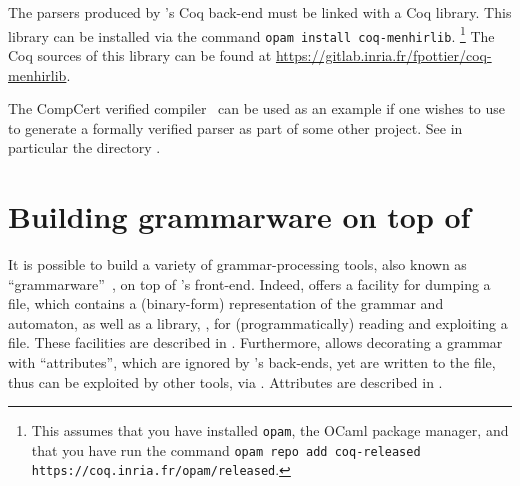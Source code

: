 \documentclass[onecolumn,11pt,nocopyrightspace,preprint]{sigplanconf}
\begin{document}


The parsers produced by \menhir's Coq back-end must be linked with a Coq
library. This library can be installed via the command \verb+opam install coq-menhirlib+.%
%
\footnote{This assumes that you have installed \texttt{opam}, the OCaml package manager,
and that you have run the command \texttt{opam repo add coq-released
https://coq.inria.fr/opam/released}.}
%
The Coq sources of this library can be found at
\url{https://gitlab.inria.fr/fpottier/coq-menhirlib}.

The CompCert verified compiler~\cite{compcert,compcert-github} can be used as
an example if one wishes to use \menhir to generate a formally verified parser
as part of some other project. See in particular the directory
.

\begin{comment}
(* Int31 *)
Extract Inductive Int31.digits => "bool" [ "false" "true" ].
Extract Inductive Int31.int31 => "int" [ "Camlcoq.Int31.constr" ] "Camlcoq.Int31.destr".
Extract Constant Int31.twice => "Camlcoq.Int31.twice".
Extract Constant Int31.twice_plus_one => "Camlcoq.Int31.twice_plus_one".
Extract Constant Int31.compare31 => "Camlcoq.Int31.compare".
Extract Constant Int31.On => "0".
Extract Constant Int31.In => "1".
\end{comment}


\section{Building grammarware on top of \menhir}
\label{sec:grammarware}

It is possible to build a variety of grammar-processing tools,
also known as ``grammarware''~\cite{klint-laemmel-verhoef-05},
on top of \menhir's front-end. Indeed, \menhir offers a facility
for dumping a \cmly file, which contains a (binary-form) representation
of the grammar and automaton,
as well as a library, \menhirsdk,
for (programmatically) reading and exploiting a \cmly file.
These facilities are described in .
%
Furthermore, \menhir allows decorating a grammar with ``attributes'',
which are ignored by \menhir's back-ends,
yet are written to the \cmly file,
thus can be exploited by other tools, via \menhirsdk.
%
Attributes are described in .
\end{document}

